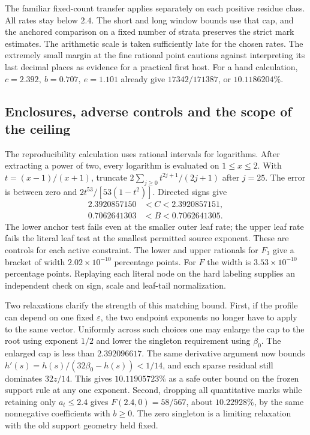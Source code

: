 \documentclass[12pt,letterpaper]{article}
\begin{document}
The familiar fixed-count transfer applies separately on each positive residue class. All rates stay below \(2.4\). The short and long window bounds use that cap, and the anchored comparison on a fixed number of strata preserves the strict mark estimates. The arithmetic scale is taken sufficiently late for the chosen rates. The extremely small margin at the fine rational point cautions against interpreting its last decimal places as evidence for a practical first host. For a hand calculation, \(c=2.392,\ b=0.707,\ e=1.101\) already give \(17342/171387\), or \(10.1186204\%\).

\subsection{Enclosures, adverse controls and the scope of the ceiling}

The reproducibility calculation uses rational intervals for logarithms. After extracting a power of two, every logarithm is evaluated on \(1\le x\le2\). With \(t=(x-1)/(x+1)\), truncate \(2\sum_{j\ge0}t^{2j+1}/(2j+1)\) after \(j=25\). The error is between zero and \(2t^{53}/[53(1-t^2)]\). Directed signs give
\[
\begin{split}
2.3920857150 &< C < 2.3920857151,\\
0.7062641303 &< B < 0.7062641305 .
\end{split}
\]
The lower anchor test fails even at the smaller outer leaf rate; the upper leaf rate fails the literal leaf test at the smallest permitted source exponent. These are controls for each active constraint. The lower and upper rationals for \(F_3\) give a bracket of width \(2.02\times10^{-10}\) percentage points. For \(F\) the width is \(3.53\times10^{-10}\) percentage points. Replaying each literal node on the hard labeling supplies an independent check on sign, scale and leaf-tail normalization.

Two relaxations clarify the strength of this matching bound. First, if the profile can depend on one fixed \(\varepsilon\), the two endpoint exponents no longer have to apply to the same vector. Uniformly across such choices one may enlarge the cap to the root using exponent \(1/2\) and lower the singleton requirement using \(\beta_0\). The enlarged cap is less than \(2.392096617\). The same derivative argument now bounds \(h'(s)=h(s)/(32\beta_0-h(s))<1/14\), and each sparse residual still dominates \(32z/14\). This gives \(10.11905723\%\) as a safe outer bound on the frozen support rule at any one exponent. Second, dropping all quantitative marks while retaining only \(a_t\le2.4\) gives \(F(2.4,0)=58/567\), about \(10.22928\%\), by the same nonnegative coefficients with \(b\ge0\). The zero singleton is a limiting relaxation with the old support geometry held fixed.
\end{document}
